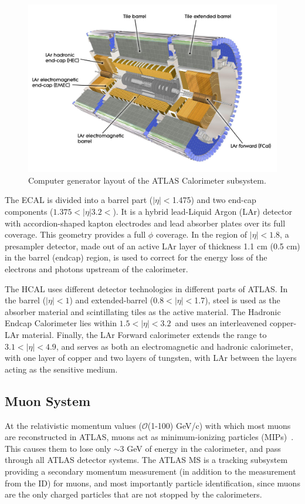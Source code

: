 \begin{figure}[!ht]
    \centering
    \includegraphics[width=0.8\linewidth]{figures/experiment/Calorimeters.png}
    \caption{Computer generator layout of the ATLAS Calorimeter subsystem.~\cite{Pequenao:1095927}}
    \label{fig:calo}
\end{figure}

The ECAL is divided into a barrel part ($|\eta|<$1.475) and two end-cap components ($1.375<|\eta|3.2<$). It is a hybrid lead-Liquid Argon (LAr) detector with accordion-shaped kapton electrodes and lead absorber plates over its full coverage. This geometry provides a full $\phi$ coverage. In the region of $|\eta|<1.8$, a presampler detector, made out of an active LAr layer of thickness 1.1 cm (0.5 cm) in the barrel (endcap) region, is used to correct for the energy loss of the electrons and photons upstream of the calorimeter.

The HCAL uses different detector technologies in different parts of ATLAS. In the barrel ($|\eta|<1$) and extended-barrel (0.8$<|\eta|<$1.7), steel is used as the absorber material and scintillating tiles as the active material. The Hadronic Endcap Calorimeter lies within $1.5<|\eta|<3.2$~and uses an interleavened copper-LAr material. Finally, the LAr Forward calorimeter extends the range to $3.1<|\eta|<4.9$, and serves as both an electromagnetic and hadronic calorimeter, with one layer of copper and two layers of tungsten, with LAr between the layers acting as the sensitive medium. 

\subsection{Muon System}

At the relativistic momentum values ($\mathcal{O}$(1-100) GeV/c) with which most muons are reconstructed in ATLAS, muons act as minimum-ionizing particles (MIPs)~\cite{Workman:2022ynf}. This causes them to lose only $\sim$3 GeV of energy in the calorimeter, and pass through all ATLAS detector systems. The ATLAS MS is a tracking subsystem providing a secondary momentum measurement (in addition to the measurement from the ID) for muons, and most importantly particle identification, since muons are the only charged particles that are not stopped by the calorimeters.

